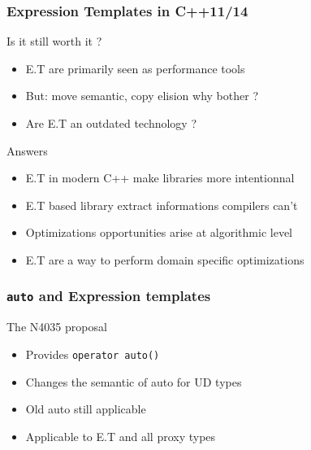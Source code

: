 
\begin{frame}
\frametitle{Expression Templates in C++11/14}
\begin{block}{Is it still worth it ?}
\begin{itemize}
\item E.T are primarily seen as performance tools
\item But: move semantic, copy elision why bother ?
\item Are E.T an outdated technology ?
\end{itemize}
\end{block}{}

\begin{block}{Answers}
\begin{itemize}
\item E.T in modern C++ make libraries more intentionnal
\item E.T based library extract informations compilers can't
\item Optimizations opportunities arise at algorithmic level
\item \alert{E.T are a way to perform domain specific optimizations}
\end{itemize}
\end{block}{}
\end{frame}

\begin{frame}
\frametitle{\texttt{auto} and Expression templates}
\begin{block}{The N4035 proposal}
\begin{itemize}
\item Provides \texttt{operator auto()}
\item Changes the semantic of auto for UD types
\item Old auto still applicable
\item Applicable to E.T and all proxy types
\end{itemize}
\end{block}{}


\end{frame}

